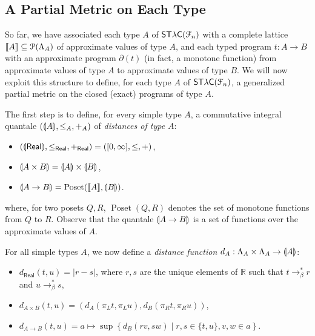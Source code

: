 \subsection{A Partial Metric on Each Type}
\label{subsection:type-gpms}

So far, we have associated each type $A$ of $\mathsf{ST\lambda C}(\mathcal F_{n})$ with a complete lattice $\llbracket A \rrbracket\subseteq \mathcal P(\Lambda_{A})$ of approximate values of type $A$, and each typed program $t:A\to B$ with an approximate program $\partial(t)$ (in fact, a monotone function) from approximate values of type $A$ to approximate values of type $B$.
We will now exploit this structure to define, for each type $A$ of $\mathsf{ST\lambda C}(\mathcal F_{n})$, a generalized partial metric on the closed (exact) programs of type $A$. %



The first step is to define, for every simple type $A$, a commutative integral quantale $(\llparenthesis A \rrparenthesis, \leq_A, +_A)$ of \emph{distances of type $A$}:
\begin{itemize}
\item $(\llparenthesis \mathsf{Real} \rrparenthesis, \leq_\mathsf{Real}, +_\mathsf{Real}) = ([0,\infty], \leq, +)$,
\item $\llparenthesis A \times B \rrparenthesis = \llparenthesis A \rrparenthesis \times \llparenthesis B \rrparenthesis$,
\item $\llparenthesis A \to B \rrparenthesis =\operatorname{Poset}(\llbracket A \rrbracket, \llparenthesis B \rrparenthesis)$.
\end{itemize}
where, for two posets $Q,R$, $\operatorname{Poset}(Q,R)$ denotes the set of monotone functions from $Q$ to $R$.
Observe that the quantale $\llparenthesis A\to B \rrparenthesis$ is a set of functions over the approximate values of $A$.

For all simple types $A$, we now define a \emph{distance function} $d_A : \Lambda_A \times \Lambda_A \to \llparenthesis A \rrparenthesis$:
\begin{itemize}
\item $d_\mathsf{Real}(t,u) = \left\vert r-s \right\vert$, where $r,s$ are the unique elements of $\mathbb{R}$ such that $t \to_\beta^* r$ and $u \to_\beta^* s$,
\item $d_{A \times B}(t,u) = (d_A(\pi_L t, \pi_L u), d_B(\pi_R t, \pi_R u))$,
\item $d_{A \to B}(t,u) = a \mapsto \sup \left\{ d_B(rv, sw) \mid r,s \in \{t,u\}, v,w \in a \right\}$.
\end{itemize}

